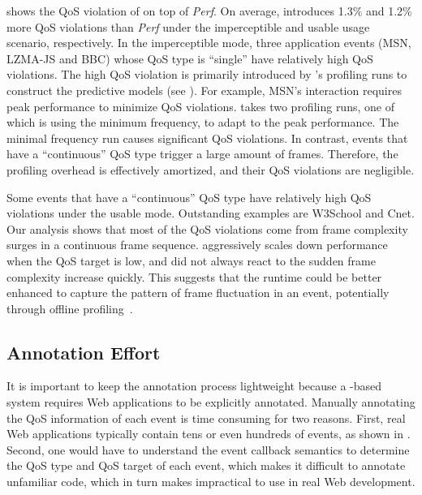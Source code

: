  shows the QoS violation of \greenweb on top of \textit{Perf}. On average, \greenweb introduces 1.3\% and 1.2\% more QoS violations than \textit{Perf} under the imperceptible and usable usage scenario, respectively. In the imperceptible mode, three application events (\textsf{MSN}, \textsf{LZMA-JS} and \textsf{BBC}) whose QoS type is ``single'' have relatively high QoS violations. The high QoS violation is primarily introduced by \greenweb's profiling runs to construct the predictive models (see ). For example, \textsf{MSN}'s interaction requires peak performance to minimize QoS violations. \greenweb takes two profiling runs, one of which is using the minimum frequency, to adapt to the peak performance. The minimal frequency run causes significant QoS violations. In contrast, events that have a ``continuous'' QoS type trigger a large amount of frames. Therefore, the profiling overhead is effectively amortized, and their QoS violations are negligible.

Some events that have a ``continuous'' QoS type have relatively high QoS violations under the usable mode. Outstanding examples are \textsf{W3School} and \textsf{Cnet}. Our analysis shows that most of the QoS violations come from frame complexity surges in a continuous frame sequence. \greenweb aggressively scales down performance when the QoS target is low, and did not always react to the sudden frame complexity increase quickly. This suggests that the \greenweb runtime could be better enhanced to capture the pattern of frame fluctuation in an event, potentially through offline profiling~\cite{pgdvfs}.

\subsection{Annotation Effort}
\label{sec:lang:eval:annotate}

It is important to keep the annotation process lightweight  because a \greenweb-based system requires Web applications to be explicitly annotated. Manually annotating the QoS information of each event is time consuming for two reasons. First, real Web applications typically contain tens or even hundreds of events, as shown in . Second, one would have to understand the event callback semantics to determine the QoS type and QoS target of each event, which makes it difficult to annotate unfamiliar code, which in turn makes \greenweb impractical to use in real Web development.

